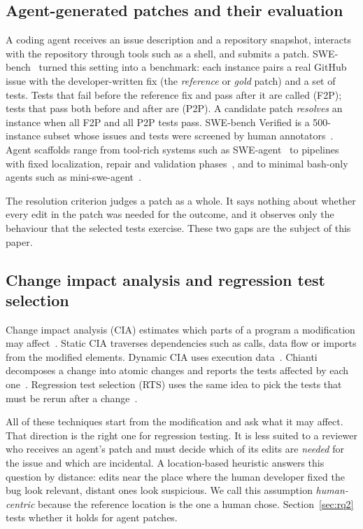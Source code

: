 \documentclass[a4paper,fleqn]{cas-sc}
\newcommand{\code}[1]{\texttt{\detokenize{#1}}}
\begin{document}
\subsection{Agent-generated patches and their evaluation}\label{sec:bg-agents}
A coding agent receives an issue description and a repository snapshot, interacts with the repository through tools such as a shell, and submits a patch. SWE-bench~\citep{jimenez2024swebench} turned this setting into a benchmark: each instance pairs a real GitHub issue with the developer-written fix (the \emph{reference} or \emph{gold} patch) and a set of tests. Tests that fail before the reference fix and pass after it are called \code{FAIL_TO_PASS} (F2P); tests that pass both before and after are \code{PASS_TO_PASS} (P2P). A candidate patch \emph{resolves} an instance when all F2P and all P2P tests pass. SWE-bench Verified is a 500-instance subset whose issues and tests were screened by human annotators~\citep{chowdhury2024verified}. Agent scaffolds range from tool-rich systems such as SWE-agent~\citep{yang2024sweagent} to pipelines with fixed localization, repair and validation phases~\citep{xia2025agentless}, and to minimal bash-only agents such as mini-swe-agent~\citep{miniswe2025}.

The resolution criterion judges a patch as a whole. It says nothing about whether every edit in the patch was needed for the outcome, and it observes only the behaviour that the selected tests exercise. These two gaps are the subject of this paper.

\subsection{Change impact analysis and regression test selection}\label{sec:bg-cia}
Change impact analysis (CIA) estimates which parts of a program a modification may affect~\citep{bohner1996cia,li2013cia}. Static CIA traverses dependencies such as calls, data flow or imports from the modified elements. Dynamic CIA uses execution data~\citep{orso2003field}. Chianti decomposes a change into atomic changes and reports the tests affected by each one~\citep{ren2004chianti}. Regression test selection (RTS) uses the same idea to pick the tests that must be rerun after a change~\citep{rothermel1997safe,yoo2012regression,gligoric2015ekstazi}.

All of these techniques start from the modification and ask what it may affect. That direction is the right one for regression testing. It is less suited to a reviewer who receives an agent's patch and must decide which of its edits are \emph{needed} for the issue and which are incidental. A location-based heuristic answers this question by distance: edits near the place where the human developer fixed the bug look relevant, distant ones look suspicious. We call this assumption \emph{human-centric} because the reference location is the one a human chose. Section~\ref{sec:rq2} tests whether it holds for agent patches.
\end{document}
